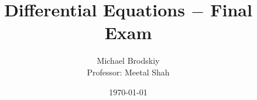 \documentclass[12pt]{article}
\title{Differential Equations $-$ Final Exam}
\date{\today}
\author{Michael Brodskiy\\ \small Professor: Meetal Shah}
\begin{document}
\maketitle

\hline
\begin{equation}
  \begin{split}
  \end{split}
  \label{1}
\end{equation}
\hline

\begin{equation}
  \begin{split}
  \end{split}
  \label{2}
\end{equation}

\hline
\begin{equation}
  \begin{split}
  \end{split}
  \label{3}
\end{equation}

\hline
\begin{equation}
  \begin{split}
  \end{split}
  \label{4}
\end{equation}

\hline
\begin{equation}
  \begin{split}
  \end{split}
  \label{5}
\end{equation}
\hline

\newpage
\hline

\begin{equation}
  \begin{split}
  \end{split}
  \label{6}
\end{equation}
\hline


\begin{equation}
  \begin{split}
  \end{split}
  \label{7}
\end{equation}
\hline

\begin{equation}
  \begin{split}
  \end{split}
  \label{8}
\end{equation}


\hline
\newpage
\hline
\begin{equation}
  \begin{split}
  \end{split}
  \label{9}
\end{equation}

\hline
\begin{equation}
  \begin{split}
  \end{split}
  \label{10}
\end{equation}
\hline

\begin{equation}
  \begin{split}
  \end{split}
  \label{11}
\end{equation}
\hline
\end{document}

